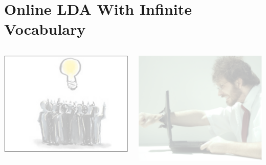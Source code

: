 \documentclass[compress]{beamer}
\begin{document}
\section{Online LDA With Infinite Vocabulary}

\begin{frame}
  \vspace{-.2cm}
  \begin{columns}
    \begin{center}
      \includegraphics[width=.85\linewidth]{cognitive/crowdsourcing_off}
      \end{center}
    \begin{center}
      \includegraphics[width=.85\linewidth]{cognitive/user_off}
      \end{center}


\end{columns}
\end{frame}
\end{document}
